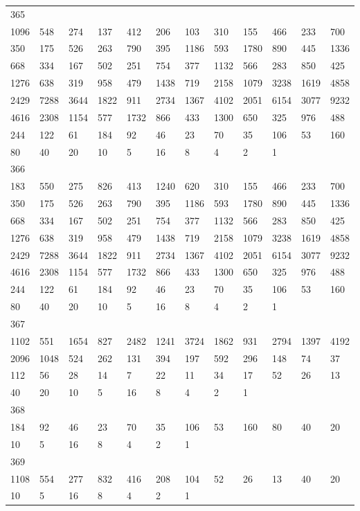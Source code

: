 \begin{longtable}{llllllllllll}
365&&&&&&&&&&&\\
1096& 548& 274& 137& 412& 206& 103& 310& 155& 466& 233& 700\\
350& 175& 526& 263& 790& 395& 1186& 593& 1780& 890& 445& 1336\\
668& 334& 167& 502& 251& 754& 377& 1132& 566& 283& 850& 425\\
1276& 638& 319& 958& 479& 1438& 719& 2158& 1079& 3238& 1619& 4858\\
2429& 7288& 3644& 1822& 911& 2734& 1367& 4102& 2051& 6154& 3077& 9232\\
4616& 2308& 1154& 577& 1732& 866& 433& 1300& 650& 325& 976& 488\\
244& 122& 61& 184& 92& 46& 23& 70& 35& 106& 53& 160\\
80& 40& 20& 10& 5& 16& 8& 4& 2& 1& \\

366&&&&&&&&&&&\\
183& 550& 275& 826& 413& 1240& 620& 310& 155& 466& 233& 700\\
350& 175& 526& 263& 790& 395& 1186& 593& 1780& 890& 445& 1336\\
668& 334& 167& 502& 251& 754& 377& 1132& 566& 283& 850& 425\\
1276& 638& 319& 958& 479& 1438& 719& 2158& 1079& 3238& 1619& 4858\\
2429& 7288& 3644& 1822& 911& 2734& 1367& 4102& 2051& 6154& 3077& 9232\\
4616& 2308& 1154& 577& 1732& 866& 433& 1300& 650& 325& 976& 488\\
244& 122& 61& 184& 92& 46& 23& 70& 35& 106& 53& 160\\
80& 40& 20& 10& 5& 16& 8& 4& 2& 1& \\

367&&&&&&&&&&&\\
1102& 551& 1654& 827& 2482& 1241& 3724& 1862& 931& 2794& 1397& 4192\\
2096& 1048& 524& 262& 131& 394& 197& 592& 296& 148& 74& 37\\
112& 56& 28& 14& 7& 22& 11& 34& 17& 52& 26& 13\\
40& 20& 10& 5& 16& 8& 4& 2& 1& \\

368&&&&&&&&&&&\\
184& 92& 46& 23& 70& 35& 106& 53& 160& 80& 40& 20\\
10& 5& 16& 8& 4& 2& 1& \\

369&&&&&&&&&&&\\
1108& 554& 277& 832& 416& 208& 104& 52& 26& 13& 40& 20\\
10& 5& 16& 8& 4& 2& 1& \\


\end{longtable}
